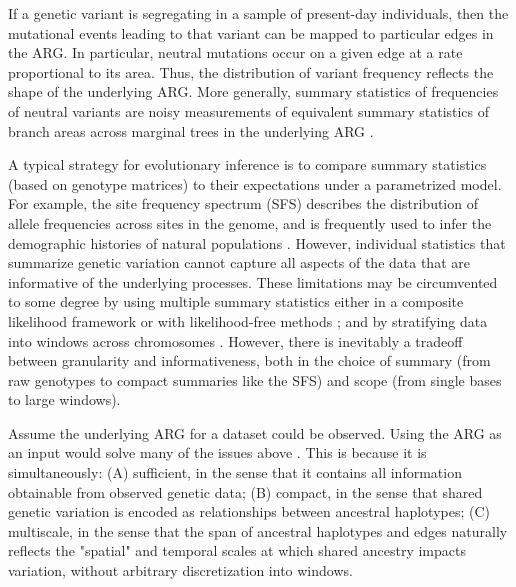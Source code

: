 If a genetic variant is segregating in a sample of present-day individuals, 
then the mutational events leading to that variant can be mapped to particular edges in the ARG. 
In particular, neutral mutations occur on a given edge at a rate proportional to its area.
Thus, the distribution of variant frequency reflects the shape of the underlying ARG. 
More generally, summary statistics of frequencies of neutral variants are noisy measurements of
equivalent summary statistics of branch areas across marginal trees in the underlying ARG \citep{ralph_efficiently_2020}.

A typical strategy for evolutionary inference is to compare summary statistics (based on genotype matrices) to their expectations under a parametrized model.
For example, the site frequency spectrum (SFS) describes the distribution of allele frequencies across sites in the genome,
and is frequently used to infer the demographic histories of natural populations \citep{gutenkunst_inferring_2009, schraiber_methods_2015}.
However, individual statistics that summarize genetic variation cannot capture all aspects of the data that are informative of the underlying processes.
These limitations may be circumvented to some degree by using multiple summary statistics either in a composite likelihood framework or with likelihood-free methods \citep{nielsen_genomic_2005, degiorgio_sweepfinder2_2016, sheehan_deep_2016, caldas_inference_2022, pavlidis_sweed_2013};
and by stratifying data into windows across chromosomes \citep{schrider_shic_2016, flagel_unreasonable_2019, sheehan_deep_2016}.
However, there is inevitably a tradeoff between granularity and informativeness,
both in the choice of summary (from raw genotypes to compact summaries like the SFS) and scope (from single bases to large windows).

Assume the underlying ARG for a dataset could be observed. 
Using the ARG as an input would solve many of the issues above \citep{rasmussen_genome-wide_2014}. 
This is because it is simultaneously: 
(A) sufficient, in the sense that it contains all information obtainable from observed genetic data; 
(B) compact, in the sense that shared genetic variation is encoded as relationships between ancestral haplotypes; 
(C) multiscale, in the sense that the span of ancestral haplotypes and edges naturally reflects the "spatial" and temporal scales at which shared ancestry impacts variation,
without arbitrary discretization into windows.


